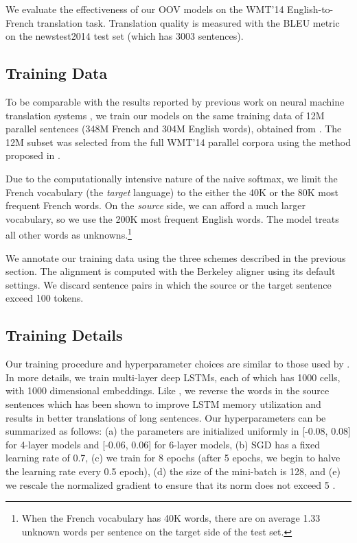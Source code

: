 We evaluate the effectiveness of our OOV models on the WMT'14 English-to-French translation 
task. Translation quality is measured with the BLEU metric \cite{Papineni02bleu} on the newstest2014 test set (which has 3003 sentences).

\subsection{Training Data}

To be comparable with the results reported by previous work on neural machine translation systems
\cite{sutskever14,cho14,bog15}, we train our models on 
the same training data of 12M parallel sentences (348M French and 304M English words), obtained from \cite{wmt14_en_fr}. 
The 12M subset was selected 
from the full WMT'14 parallel corpora using the method proposed in .%

Due to the computationally intensive nature of the naive softmax,
we limit the French vocabulary (the {\it target} language) 
to the either the 40K or the 80K most frequent French words. On the {\it source} side, 
we can afford a much larger vocabulary, so we use the 200K most frequent English words. 
The model treats all other words as unknowns.\footnote{When the French vocabulary has 40K words, there are
on average 1.33 unknown words per sentence on the target side of the test set.}

We annotate our training data using the three schemes described in the previous section. The alignment 
is computed with the Berkeley aligner \cite{liang06alignment} using its default settings.
We discard sentence pairs in which the source or the target sentence exceed 100 tokens.

\subsection{Training Details}
\label{subsec:train_details}
Our training procedure and hyperparameter choices are similar to those used by
. In more details, we train multi-layer deep LSTMs, each of which has 
1000 cells, with 1000 dimensional embeddings. Like , 
we reverse the words in the source sentences which 
has been shown to improve LSTM memory utilization and results in better translations of long sentences. 
Our hyperparameters can be summarized as follows: (a) the parameters are initialized uniformly  
in [-0.08, 0.08] for 4-layer models and [-0.06, 0.06] for 6-layer models, (b) SGD has a fixed learning rate of 0.7, (c) we train for 8 epochs (after
5 epochs, we begin to halve the learning rate every 0.5 epoch), (d) the size of the mini-batch is 128, 
and (e) we rescale the normalized gradient to ensure that its norm does not
exceed 5 \cite{pascanu13}.

